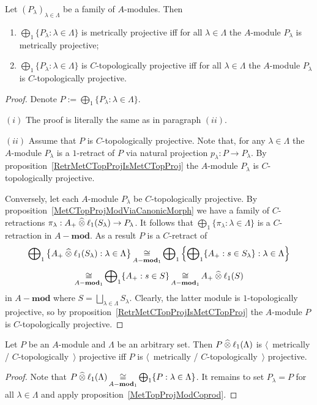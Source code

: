 \begin{proposition}\label{MetTopProjModCoprod} Let
${(P_\lambda)}_{\lambda\in\Lambda}$ be a family of $A$-modules. Then 
\begin{enumerate}[label = (\roman*)]
    \item $\bigoplus_1 \{P_\lambda:\lambda\in\Lambda \}$ is metrically
    projective iff for all $\lambda\in\Lambda$ the $A$-module $P_\lambda$ is
    metrically projective;

    \item $\bigoplus_1 \{P_\lambda:\lambda\in\Lambda \}$ is $C$-topologically
    projective iff for all $\lambda\in\Lambda$ the $A$-module $P_\lambda$ is
    $C$-topologically projective.
\end{enumerate}
\end{proposition}
\begin{proof} Denote $P:=\bigoplus_1 \{P_\lambda:\lambda\in\Lambda \}$.

$(i)$ The proof is literally the same as in paragraph $(ii)$.

$(ii)$ Assume that $P$ is $C$-topologically projective. Note that, for any
$\lambda\in\Lambda$ the $A$-module $P_\lambda$ is a $1$-retract of $P$ via
natural projection $p_\lambda:P\to P_\lambda$. By
proposition~\ref{RetrMetCTopProjIsMetCTopProj} the $A$-module $P_\lambda$ is
$C$-topologically projective.

Conversely, let each $A$-module $P_\lambda$ be $C$-topologically projective. By
proposition~\ref{MetCTopProjModViaCanonicMorph} we have a family 
of $C$-retractions $\pi_\lambda:A_+\mathbin{\widehat{\otimes}}\ell_1(S_\lambda)\to P_\lambda$. 
It follows that
$\bigoplus_1 \{\pi_\lambda:\lambda\in\Lambda \}$ is a $C$-retraction in
$A-\mathbf{mod}$. As a result $P$ is a $C$-retract of 
$$
\bigoplus\nolimits_1\left \{A_+\mathbin{\widehat{\otimes}}
\ell_1(S_\lambda):\lambda\in\Lambda\right \} \mathop{\mathbin{\cong}}\limits_{A-\mathbf{mod}_1}
\bigoplus\nolimits_1\left \{\bigoplus\nolimits_1 \{A_+:s\in S_\lambda
\}:\lambda\in\Lambda\right \}
$$
$$
\mathop{\mathbin{\cong}}\limits_{A-\mathbf{mod}_1} \bigoplus\nolimits_1 \{A_+:s\in S \}
\mathop{\mathbin{\cong}}\limits_{A-\mathbf{mod}_1} A_+ \mathbin{\widehat{\otimes}} \ell_1(S)
$$
in $A-\mathbf{mod}$ where $S=\bigsqcup_{\lambda\in\Lambda}S_\lambda$. Clearly,
the latter module is $1$-topologically projective, so by
proposition~\ref{RetrMetCTopProjIsMetCTopProj} the $A$-module $P$ is 
$C$-topologically projective.
\end{proof}

\begin{corollary}\label{MetTopProjTensProdWithl1} Let $P$ be an $A$-module and
$\Lambda$ be an arbitrary set. Then $P\mathbin{\widehat{\otimes}} \ell_1(\Lambda)$ is
$\langle$~metrically / $C$-topologically~$\rangle$ projective iff $P$ is
$\langle$~metrically / $C$-topologically~$\rangle$ projective.
\end{corollary}
\begin{proof} 
Note that 
$P\mathbin{\widehat{\otimes}} \ell_1(\Lambda)
\mathop{\mathbin{\cong}}\limits_{A-\mathbf{mod}_1}
\bigoplus_1 \{P:\lambda\in\Lambda \}$. It remains to set $P_\lambda=P$ for all
$\lambda\in\Lambda$ and apply proposition~\ref{MetTopProjModCoprod}.
\end{proof}

